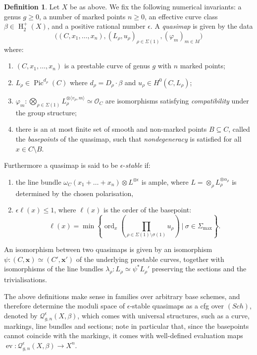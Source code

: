 \documentclass[11pt]{amsart}
\newcommand{\Qe}[4]{\mathcal{Q}^{\epsilon}_{#1,#2}(#3,#4)}
\newcommand{\OO}{\mathcal{O}}
\renewcommand{\to}{\rightarrow}
\newcommand{\Pic}{\operatorname{Pic}}
\newcommand{\HH}{\operatorname{H}}
\newcommand{\ev}{\operatorname{ev}}
\theoremstyle{definition}
\theoremstyle{definition}
\newtheorem{definition}[thm]{Definition}
\newcommand{\ilemph}[1]{\emph{#1}}
\begin{document}
\begin{definition}\cite[Definition 3.1.1]{CF-K} Let $X$ be as above. We fix the following numerical invariants: a genus $g \geq 0$, a number of marked points $n \geq 0$, an effective curve class $\beta \in \HH_2^+(X)$, and a positive rational number $\epsilon$. A \ilemph{quasimap} is given by the data
\begin{equation*} \Big((C,x_1,\ldots,x_n), (L_\rho,u_\rho)_{\rho \in \Sigma(1)}, (\varphi_m)_{m \in M}\Big) \end{equation*}
where:
\begin{enumerate}
\item $(C,x_1,\ldots,x_n)$ is a prestable curve of genus $g$ with $n$ marked points;
\item $L_\rho\in\Pic^{d_\rho}(C)$  where $d_\rho = D_\rho \cdot \beta$ and $u_\rho\in H^0(C,L_\rho)$;
\item $\varphi_m \colon \bigotimes_{\rho \in \Sigma(1)} L_\rho^{\otimes \langle v_\rho, m \rangle} \simeq \OO_C$ are isomorphisms satisfying \ilemph{compatibility} under the group structure;
\item there is an at most finite set of smooth and non-marked points $B \subseteq C$, called the \ilemph{basepoints} of the quasimap, such that \ilemph{nondegeneracy} is satisfied for all $x \in C \setminus B$.
\end{enumerate}
Furthermore a quasimap is said to be $\epsilon$-\ilemph{stable} if:
\begin{enumerate}[resume]
 \item the line bundle $ \omega_C(x_1 + \ldots + x_n)\otimes L^{\otimes \epsilon}$ is ample, where $L = \otimes_\rho L_\rho^{\otimes \alpha_\rho}$ is determined by the chosen polarisation,
 \item $\epsilon \ell(x)\leq 1$, where $\ell(x)$ is the order of the basepoint:
\[\ell(x)=\min\left\{\operatorname{ord}_x\left(\prod_{\rho\in\Sigma(1)\setminus \sigma(1)}u_\rho\right)\ |\ \sigma\in\Sigma_{\operatorname{max}}\right\}.\]
\end{enumerate}
An isomorphism between two quasimaps is given by an isomorphism $\psi\colon (C,\mathbf x)\simeq(C',\mathbf x')$ of the underlying prestable curves, together with isomorphisms of the line bundles $\lambda_\rho\colon L_\rho\simeq \psi^* L_\rho'$ preserving the sections and the trivialisations.
\end{definition}

The above definitions make sense in families over arbitrary base schemes, and therefore determine the moduli space of $\epsilon$-stable quasimaps as a cfg over $(Sch)$, denoted by $\Qe{g}{n}{X}{\beta}$, which comes with universal structures, such as a curve, markings, line bundles and sections; note in particular that, since the basepoints cannot coincide with the markings, it comes with well-defined evaluation maps $\ev\colon \Qe{g}{n}{X}{\beta}\to X^n$.
\end{document}
